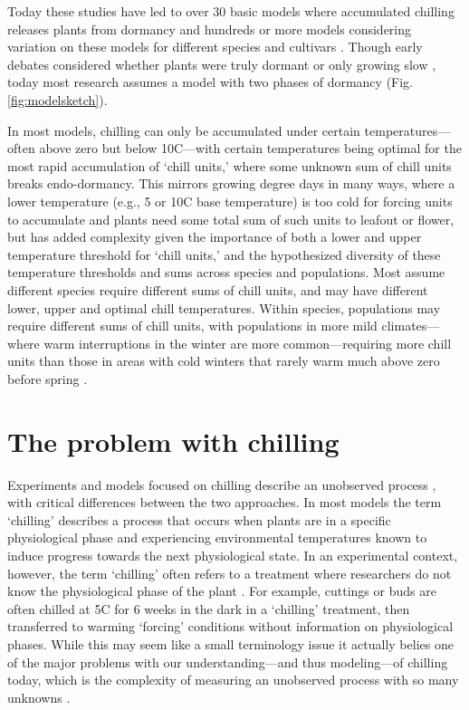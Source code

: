 \documentclass[11pt]{article}
\begin{document}
Today these studies have led to over 30 basic models where accumulated chilling releases plants from dormancy and hundreds or more models considering variation on these models for different species and cultivars \citep[][]{basler2016evaluating,hufkens2018integrated}. Though early debates considered whether plants were truly dormant or only growing slow \citep[`dormancy' or `rest' versus `quiescent;][]{considine2016language}, today most research assumes a model with two phases of dormancy (Fig. \ref{fig:modelsketch}). 

In most models, chilling can only be accumulated under certain temperatures---often above zero but below 10\degree C---with certain temperatures being optimal for the most rapid accumulation of `chill units,' where some unknown sum of chill units breaks endo-dormancy. This mirrors growing degree days in many ways, where a lower temperature (e.g., 5 or 10\degree C base temperature) is too cold for forcing units to accumulate and plants need some total sum of such units to leafout or flower, but has added complexity given the importance of both a lower and upper temperature threshold for `chill units,' and the hypothesized diversity of these temperature thresholds and sums across species and populations. Most assume different species require different sums of chill units, and may have different lower, upper and optimal chill temperatures. Within species, populations may require different sums of chill units, with populations in more mild climates---where warm interruptions in the winter are more common---requiring more chill units than those in areas with cold winters that rarely warm much above zero before spring \citep{campbell1979,leinonen1996dependence}. 

\section*{The problem with chilling} 

Experiments and models focused on chilling describe an unobserved process \citep{chuine2016,chuinearees}, with critical differences between the two approaches. In most models the term `chilling' describes a process that occurs when plants are in a specific physiological phase and experiencing environmental temperatures known to induce progress towards the next physiological state. In an experimental context, however, the term `chilling' often refers to a treatment where researchers do not know the physiological phase of the plant \citep{flynn2018,ospreebbms}. For example, cuttings or buds are often chilled at 5\degree C for 6 weeks in the dark in a `chilling' treatment, then transferred to warming `forcing' conditions without information on physiological phases. While this may seem like a small terminology issue it actually belies one of the major problems with our understanding---and thus modeling---of chilling today, which is the complexity of measuring an unobserved process with so many unknowns \citep{ospreebbms}. %
\end{document}
